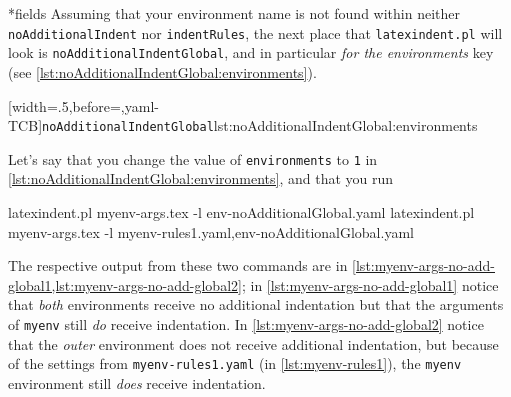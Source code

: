 *{fields}
 Assuming that your environment name is not found within neither
 \texttt{noAdditionalIndent} nor \texttt{indentRules}, the next place that
 \texttt{latexindent.pl} will look is \texttt{noAdditionalIndentGlobal}, and in
 particular \emph{for the environments} key (see
 \cref{lst:noAdditionalIndentGlobal:environments}).

 [width=.5\linewidth,before=\centering,yaml-TCB]{\texttt{noAdditionalIndentGlobal}}{lst:noAdditionalIndentGlobal:environments}

 \begin{example}
 Let's say that you change the value of \texttt{environments} to \texttt{1} in
 \cref{lst:noAdditionalIndentGlobal:environments}, and that you run 

 \begin{widepage}

  \begin{commandshell}
latexindent.pl myenv-args.tex -l env-noAdditionalGlobal.yaml
latexindent.pl myenv-args.tex -l myenv-rules1.yaml,env-noAdditionalGlobal.yaml
\end{commandshell}

 \end{widepage}

 The respective output from these two commands are in
 \cref{lst:myenv-args-no-add-global1,lst:myenv-args-no-add-global2}; in
 \cref{lst:myenv-args-no-add-global1} notice that \emph{both} environments receive no
 additional indentation but that the arguments of \texttt{myenv} still \emph{do} receive
 indentation. In \cref{lst:myenv-args-no-add-global2} notice that the \emph{outer}
 environment does not receive additional indentation, but because of the settings from
 \texttt{myenv-rules1.yaml} (in \vref{lst:myenv-rules1}), the \texttt{myenv} environment
 still \emph{does} receive indentation.

 \begin{cmhtcbraster}
 \end{cmhtcbraster}
 \end{example}

